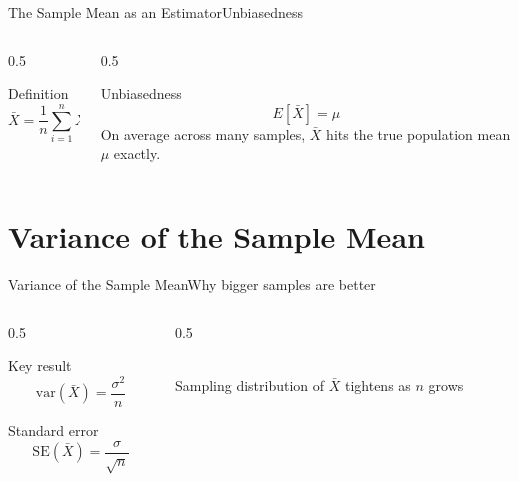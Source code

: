 \documentclass[aspectratio=169,11pt]{beamer}
\begin{document}
\begin{frame}{The Sample Mean as an Estimator}{Unbiasedness}
  \begin{columns}[T]
    \begin{column}{0.5\textwidth}
      \begin{block}{Definition}
        \[ \bar X = \frac{1}{n}\sum_{i=1}^n X_i \]
      \end{block}
    \end{column}
    \begin{column}{0.5\textwidth}
      \begin{exampleblock}{Unbiasedness}
        \small
        \[ E[\bar X] = \mu \]
        \small On average across many samples, $\bar X$ hits the true
        population mean $\mu$ exactly.
      \end{exampleblock}
    \end{column}
  \end{columns}
\end{frame}

\section{Variance of the Sample Mean}

\begin{frame}{Variance of the Sample Mean}{Why bigger samples are better}
  \begin{columns}[T]
    \begin{column}{0.5\textwidth}
      \begin{block}{Key result}
        \[ \text{var}(\bar X) = \frac{\sigma^2}{n} \]
      \end{block}
      \begin{exampleblock}{Standard error}
        \[ \text{SE}(\bar X) = \frac{\sigma}{\sqrt n} \]
      \end{exampleblock}
    \end{column}
    \begin{column}{0.5\textwidth}
      \centering
      \\
      \scriptsize Sampling distribution of $\bar X$ tightens as $n$ grows
    \end{column}
  \end{columns}
\end{frame}
\end{document}
